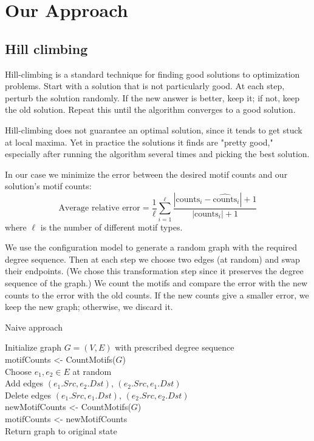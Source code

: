 \section{Our Approach}
\label{sec:approach}

\subsection{Hill climbing}
Hill-climbing is a standard technique for finding good solutions to optimization problems.  Start with a solution that is not particularly good.  At each step, perturb the solution randomly.  If the new answer is better, keep it; if not, keep the old solution.  Repeat this until the algorithm converges to a good solution.

Hill-climbing does not guarantee an optimal solution, since it tends to get stuck at local maxima.  Yet in practice the solutions it finds are "pretty good," especially after running the algorithm several times and picking the best solution.

In our case we minimize the error between the desired motif counts and our solution's motif counts: $$\mbox{Average relative error} = \frac{1}{\ell} \sum_{i = 1}^{\ell} \frac{|\mbox{counts}_i - \widehat{\mbox{counts}}_i| + 1}{|\mbox{counts}_i| + 1}$$ where $\ell$ is the number of different motif types.

We use the configuration model to generate a random graph with the required degree sequence.  Then at each step we choose two edges (at random) and swap their endpoints.  (We chose this transformation step since it preserves the degree sequence of the graph.)  We count the motifs and compare the error with the new counts to the error with the old counts.  If the new counts give a smaller error, we keep the new graph; otherwise, we discard it.

\begin{algorithm}
\caption{Naive approach}
\label{algorithm:naive}
\begin{algorithmic}
Initialize graph $G = (V, E)$ with prescribed degree sequence\\
motifCounts <- CountMotifs($G$)\\
 {
	Choose $e_1, e_2 \in E$ at random\\
	Add edges $(e_1.Src, e_2.Dst)$, $(e_2.Src, e_1.Dst)$\\
	Delete edges $(e_1.Src, e_1.Dst)$, $(e_2.Src, e_2.Dst)$\\
	newMotifCounts <- CountMotifs($G$)\\
	 {
		motifCounts <- newMotifCounts\\
	} {
		Return graph to original state\\
	}
}

\end{algorithmic}
\end{algorithm}

